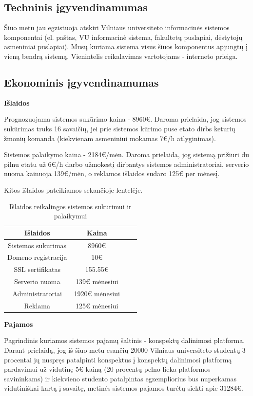 \documentclass{VUMIFPSkursinis}
\begin{document}
\subsection{Techninis įgyvendinamumas}
Šiuo metu jau egzistuoja atskiri Vilniaus universiteto informacinės sistemos komponentai (el. paštas, VU informacinė sistema, fakultetų puslapiai, dėstytojų asmeniniai puslapiai). Mūsų kuriama sistema visus šiuos komponentus apjungtų į vieną bendrą sistemą. Vienintelis reikalavimas vartotojams - interneto prieiga.

\subsection{Ekonominis įgyvendinamumas}
\textbf{Išlaidos}

Prognozuojama sistemos sukūrimo kaina - 8960€. Daroma prielaida, jog sistemos sukūrimas truks 16 savaičių, jei prie sistemos kūrimo puse etato dirbs keturių žmonių komanda (kiekvienam asmeniniui mokamas 7€/h atlyginimas).

Sistemos palaikymo kaina - 2184€/mėn. Daroma prielaida, jog sistemą prižiūri du pilnu etatu už 6€/h darbo užmokestį dirbantys sistemos administratoriai, serverio nuoma kainuoja 139€/mėn, o reklamos išlaidos sudaro 125€ per mėnesį.

Kitos išlaidos pateikiamos sekančioje lentelėje.

\begin{table}[H]
	\centering
	\caption{Išlaidos reikalingos sistemos sukūrimui ir palaikymui}
    {\begin{tabular}{|c|c|c|c|} \hline
			Išlaidos & Kaina  \\
			\hline
			Sistemos sukūrimas & 8960€\\
			\hline
			Domeno registracija & 10€  \\
			\hline
			SSL sertifikatas & 155.55€ \\
			\hline
			Serverio nuoma & 139€ mėnesiui \\
			\hline
			Administratoriai & 1920€ mėnesiui \\
			\hline
			Reklama & 125€ mėnesiui \\
			\hline
	\end{tabular}}
\end{table}

\textbf{Pajamos}

Pagrindinis kuriamos sistemos pajamų šaltinis - konspektų dalinimosi platforma. Darant prielaidą, jog iš šiuo metu esančių 20000 Vilniaus universiteto studentų 3 procentai jų nuspręs patalpinti konspektus į konspektų dalinimosi platformą pardavimui už vidutinę 5€ kainą (20 procentų pelno lieka platformos savininkams) ir kiekvieno studento patalpintas egzempliorius bus nuperkamas vidutiniškai kartą į savaitę, metinės sistemos pajamos turėtų siekti apie 31284€.
\end{document}
